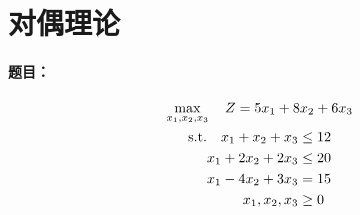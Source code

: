\documentclass[UTF8]{ctexart}
\begin{document}
\subsection{}

\section{对偶理论}
\paragraph{题目：} 

\begin{gather*}
    \max_{x_1, x_2, x_3}\quad Z = 5x_1 + 8x_2+6x_3\\
    \begin{aligned}
    \textup{s.t.}\quad  x_1 + x_2 + x_3 &\leq 12 \\
                        x_1 + 2x_2 + 2x_3 &\leq 20 \\
                        x_1 - 4x_2 + 3x_3 &= 15 \\
                        x_1, x_2, x_3 &\geq 0 \\
    \end{aligned}
\end{gather*}

\subsection{}
\end{document}
